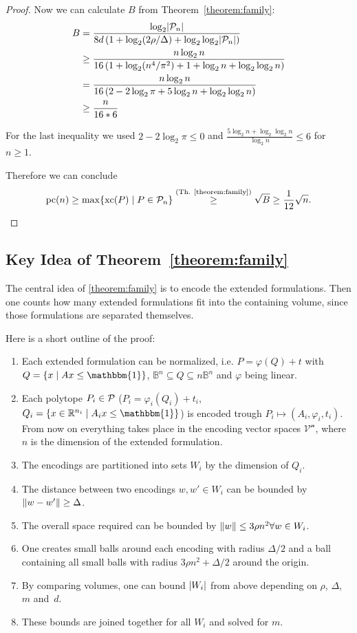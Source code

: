 \begin{proof}
  Now we can calculate $B$ from Theorem~\ref{theorem:family}:
  \begin{align*}
    B &= \frac{\log_2 \abs{\P_n}}{8d \left(1 + \log_2 (2\rho/\Delta) + \log_2\log_2 \abs{\P_n} \right)}\\
    &\geq \frac{n \log_2 n}{16 \left(1 + \log_2 (n^4 / \pi^2) + 1 + \log_2 n + \log_2 \log_2 n \right)}\\
    &= \frac{n \log_2 n}{16 \left(2 - 2 \log_2 \pi + 5 \log_2 n + \log_2 \log_2 n \right)}\\
    &\geq \frac{n}{16*6}
  \end{align*}

  For the last inequality we used $2 - 2 \log_2 \pi \leq 0$ and $\frac{5 \log_2 n + \log_2 \log_2 n}{\log_2 n} \leq 6$ for $n \geq 1$.

  Therefore we can conclude $$\pc(n) \geq \max \{\xc(P) \mid P \in \P_n\} \stackrel{\text{(Th. \ref{theorem:family})}}{\geq} \sqrt{B} \geq \frac{1}{12} \sqrt{n} .$$
\end{proof}



\subsection{Key Idea of Theorem~\ref{theorem:family}}

The central idea of \ref{theorem:family} is to encode the extended formulations. Then one counts how many extended formulations fit into the containing volume, since those formulations are separated themselves.

Here is a short outline of the proof:
\begin{enumerate}
  \item Each extended formulation can be normalized, i.e. $P = \varphi(Q) + t$ with $Q = \{ x \mid Ax \leq \mathbbm{1} \}$, $\mathbb{B}^n \subseteq Q \subseteq n\mathbb{B}^n$ and $\varphi$ being linear.
  \item Each polytope $P_i \in \P$ ($P_i = \varphi_i(Q_i) + t_i$, $Q_i = \{ x \in \R^{n_i} \mid A_ix \leq \mathbbm{1} \}$) is encoded trough $P_i \mapsto (A_i, \varphi_i, t_i)$.\\
  From now on everything takes place in the encoding vector spaces $\mathcal{V^n}$, where $n$ is the dimension of the extended formulation.
  \item The encodings are partitioned into sets $W_i$ by the dimension of $Q_i$.
  \item The distance between two encodings $w, w' \in W_i$ can be bounded by $\norm{w - w'} \geq \Delta$.
  \item The overall space required can be bounded by $\norm{w} \leq 3\rho n^2 \forall w \in W_i$.
  \item One creates small balls around each encoding with radius $\Delta/2$ and a ball containing all small balls with radius $3\rho n^2 + \Delta/2$ around the origin.
  \item By comparing volumes, one can bound $\abs{W_i}$ from above depending on $\rho$, $\Delta$, $m$ and~$d$.
  \item These bounds are joined together for all $W_i$ and solved for $m$.
\end{enumerate}

